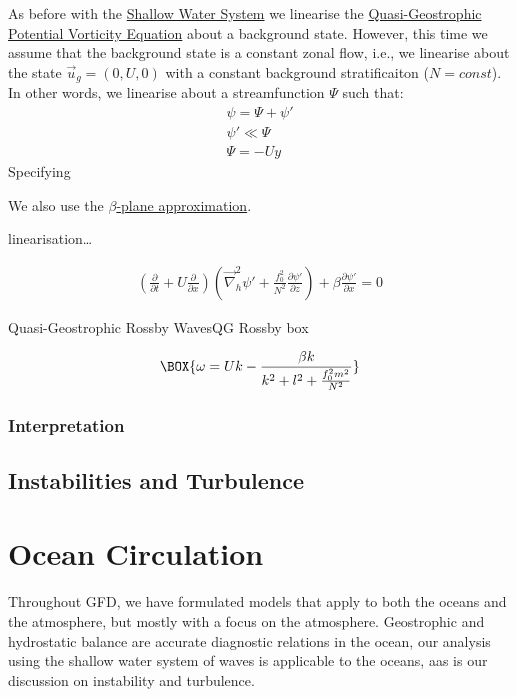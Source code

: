 As before with the \hyperref[Shallow Water System]{Shallow Water System} we linearise the \hyperref[QGPV]{Quasi-Geostrophic Potential Vorticity Equation} about a background state. However, this time we assume that the background state is a constant zonal flow, i.e., we linearise about the state $\vec{u}_g=(0,U,0)$ with a constant background stratificaiton ($N=const$). In other words, we linearise about a streamfunction $\Psi$ such that:
\begin{align*}
    \psi = \Psi + \psi'
    \\
    \psi' \ll \Psi
    \\
    \Psi = -Uy
\end{align*}
Specifying 

We also use the \hyperref[beta plane box]{$\beta$-plane approximation}.

linearisation\dots

\begin{align*}
    \left( \frac{\partial }{\partial t}+U\frac{\partial }{\partial x} \right)
    \left( 
        \vec{\nabla}_h^2 \psi' 
        +\frac{f_0^2}{N^2}\frac{\partial \psi'}{\partial z}
     \right)
    +
    \beta \frac{\partial \psi' }{\partial x}
    =
    0
\end{align*}

\begin{fact}{Quasi-Geostrophic Rossby Waves}{QG Rossby box}\label{QG Rossby box}

    \begin{gather}
        \BOX{
            \omega = Uk - \frac{\beta k}{k^2 + l^2 +\frac{f_0^2 m^2}{N^2}}
        }
    \end{gather}
\end{fact}

\subsection{Interpretation}



\section{Instabilities and Turbulence}

\chapter{Ocean Circulation}\label{Oceans}

Throughout GFD, we have formulated models that apply to both the oceans and the atmosphere, but mostly with a focus on the atmosphere. Geostrophic and hydrostatic balance are accurate diagnostic relations in the ocean, our analysis using the shallow water system of waves is applicable to the oceans, aas is our discussion on instability and turbulence.

